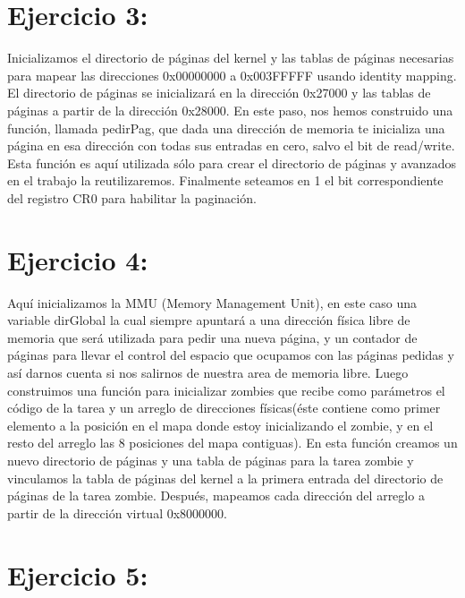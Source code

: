 \documentclass[a4paper]{article}
\begin{document}
\clearpage

\section{Ejercicio 3:}
%

Inicializamos el directorio de páginas del kernel y las tablas de páginas necesarias para mapear las direcciones 0x00000000 a 0x003FFFFF usando identity mapping. El directorio de páginas se inicializará en la dirección 0x27000 y las tablas de páginas a partir de la dirección 0x28000. En este paso, nos hemos construido una función, llamada pedirPag, que dada una dirección de memoria te inicializa una página en esa dirección con todas sus entradas en cero, salvo el bit de read/write. Esta función es aquí utilizada sólo para crear el directorio de páginas y avanzados en el trabajo la reutilizaremos. Finalmente seteamos en 1 el bit correspondiente del registro CR0 para habilitar la paginación.

\clearpage

\section{Ejercicio 4:}
%

Aquí inicializamos la MMU (Memory Management Unit), en este caso una variable dirGlobal la cual siempre apuntará a una dirección física libre de memoria que será utilizada para pedir una nueva página, y un contador de páginas para llevar el control del espacio que ocupamos con las páginas pedidas y así darnos cuenta si nos salirnos de nuestra area de memoria libre. Luego construimos una función para inicializar zombies que recibe como parámetros el código de la tarea y un arreglo de direcciones físicas(éste contiene como primer elemento a la posición en el mapa donde estoy inicializando el zombie, y en el resto del arreglo las 8 posiciones del mapa contiguas). En esta función creamos un nuevo directorio de páginas y una tabla de páginas para la tarea zombie y vinculamos la tabla de páginas del kernel a la primera entrada del directorio de páginas de la tarea zombie. Después, mapeamos cada dirección del arreglo a partir de la dirección virtual 0x8000000.

\clearpage

\section{Ejercicio 5:}
%
\end{document}
